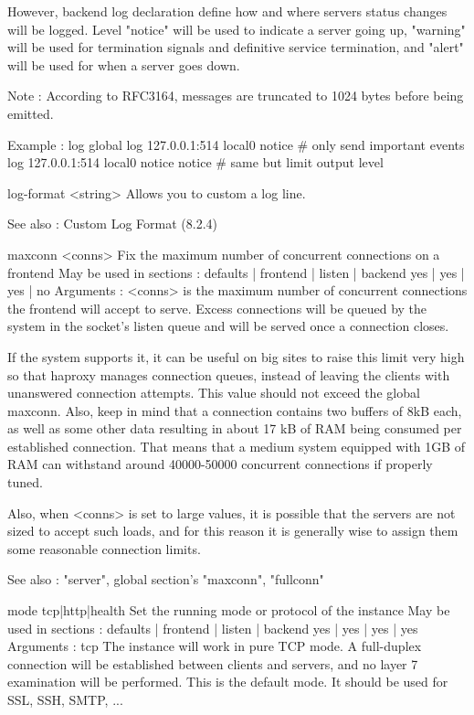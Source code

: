   However, backend log declaration define how and where servers status changes
  will be logged. Level "notice" will be used to indicate a server going up,
  "warning" will be used for termination signals and definitive service
  termination, and "alert" will be used for when a server goes down.

  Note : According to RFC3164, messages are truncated to 1024 bytes before
         being emitted.

  Example :
    log global
    log 127.0.0.1:514 local0 notice         # only send important events
    log 127.0.0.1:514 local0 notice notice  # same but limit output level

log-format <string>
   Allows you to custom a log line.

   See also : Custom Log Format (8.2.4)


maxconn <conns>
  Fix the maximum number of concurrent connections on a frontend
  May be used in sections :   defaults | frontend | listen | backend
                                 yes   |    yes   |   yes  |   no
  Arguments :
    <conns>   is the maximum number of concurrent connections the frontend will
              accept to serve. Excess connections will be queued by the system
              in the socket's listen queue and will be served once a connection
              closes.

  If the system supports it, it can be useful on big sites to raise this limit
  very high so that haproxy manages connection queues, instead of leaving the
  clients with unanswered connection attempts. This value should not exceed the
  global maxconn. Also, keep in mind that a connection contains two buffers
  of 8kB each, as well as some other data resulting in about 17 kB of RAM being
  consumed per established connection. That means that a medium system equipped
  with 1GB of RAM can withstand around 40000-50000 concurrent connections if
  properly tuned.

  Also, when <conns> is set to large values, it is possible that the servers
  are not sized to accept such loads, and for this reason it is generally wise
  to assign them some reasonable connection limits.

  See also : "server", global section's "maxconn", "fullconn"


mode { tcp|http|health }
  Set the running mode or protocol of the instance
  May be used in sections :   defaults | frontend | listen | backend
                                 yes   |    yes   |   yes  |   yes
  Arguments :
    tcp       The instance will work in pure TCP mode. A full-duplex connection
              will be established between clients and servers, and no layer 7
              examination will be performed. This is the default mode. It
              should be used for SSL, SSH, SMTP, ...

